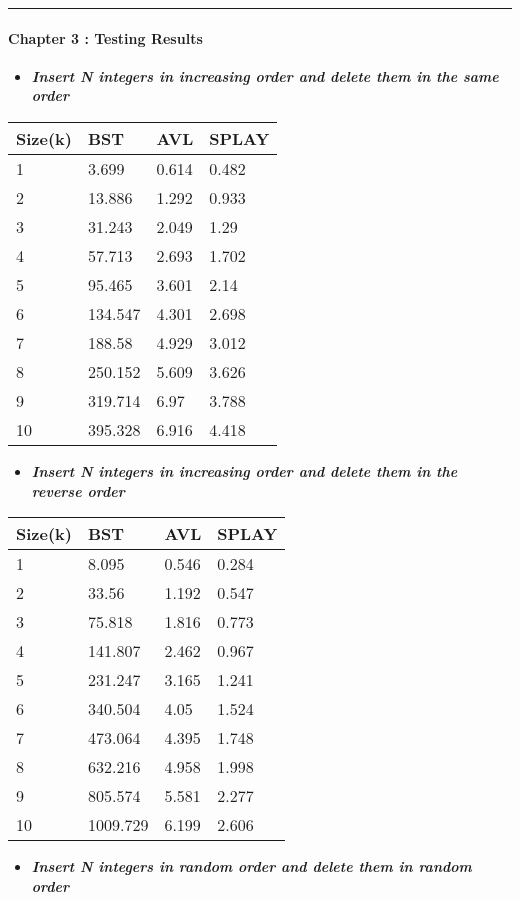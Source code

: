 \documentclass[]{article}
\let\oldparagraph\paragraph
\renewcommand{\paragraph}[1]{\oldparagraph{#1}\mbox{}}
\begin{document}
\begin{center}\rule{0.5\linewidth}{\linethickness}\end{center}

\paragraph{Chapter 3 : Testing Results}\label{header-n73}

\begin{itemize}
\item
  \textbf{\emph{Insert N integers in increasing order and delete them in
  the same order}}
\end{itemize}

\begin{longtable}[]{@{}llll@{}}
\toprule
Size(k) & BST & AVL & SPLAY\tabularnewline
\midrule
\endhead
1 & 3.699 & 0.614 & 0.482\tabularnewline
2 & 13.886 & 1.292 & 0.933\tabularnewline
3 & 31.243 & 2.049 & 1.29\tabularnewline
4 & 57.713 & 2.693 & 1.702\tabularnewline
5 & 95.465 & 3.601 & 2.14\tabularnewline
6 & 134.547 & 4.301 & 2.698\tabularnewline
7 & 188.58 & 4.929 & 3.012\tabularnewline
8 & 250.152 & 5.609 & 3.626\tabularnewline
9 & 319.714 & 6.97 & 3.788\tabularnewline
10 & 395.328 & 6.916 & 4.418\tabularnewline
\bottomrule
\end{longtable}

\begin{itemize}
\item
  \textbf{\emph{Insert N integers in increasing order and delete them in
  the reverse order}}
\end{itemize}

\begin{longtable}[]{@{}llll@{}}
\toprule
Size(k) & BST & AVL & SPLAY\tabularnewline
\midrule
\endhead
1 & 8.095 & 0.546 & 0.284\tabularnewline
2 & 33.56 & 1.192 & 0.547\tabularnewline
3 & 75.818 & 1.816 & 0.773\tabularnewline
4 & 141.807 & 2.462 & 0.967\tabularnewline
5 & 231.247 & 3.165 & 1.241\tabularnewline
6 & 340.504 & 4.05 & 1.524\tabularnewline
7 & 473.064 & 4.395 & 1.748\tabularnewline
8 & 632.216 & 4.958 & 1.998\tabularnewline
9 & 805.574 & 5.581 & 2.277\tabularnewline
10 & 1009.729 & 6.199 & 2.606\tabularnewline
\bottomrule
\end{longtable}

\begin{itemize}
\item
  \textbf{\emph{Insert N integers in random order and delete them in
  random order}}
\end{itemize}
\end{document}
